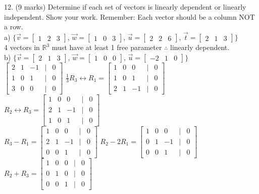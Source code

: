 \documentclass[a4paper]{article}
\begin{document}
12. (9 marks) Determine if each set of vectors is linearly dependent or linearly independent. Show your work. Remember: Each vector should be a column NOT a row.\\
a) $\{\vec{v} = \begin{bmatrix}
1&2&3
\end{bmatrix}$, $\vec{w} = \begin{bmatrix}
1&0&3
\end{bmatrix}$, $\vec{u} = \begin{bmatrix}
2&2&6
\end{bmatrix}$, $\vec{t} = \begin{bmatrix}
2&1&3
\end{bmatrix}\}$\\
4 vectors in $\mathbb{R}^3$ must have at least 1 free parameter $\therefore$ linearly dependent.\\
b) $\{\vec{v} = \begin{bmatrix}
2&1&3
\end{bmatrix}$, $\vec{w} = \begin{bmatrix}
1&0&0
\end{bmatrix}$, $\vec{u} = \begin{bmatrix}
-2&1&0
\end{bmatrix}\}$\\
$\begin{bmatrix}
2&1&-1&|&0\\
1&0&1&|&0\\
3&0&0&|&0
\end{bmatrix}$ $\frac{1}{3}R_3 \leftrightarrow R_1 = \begin{bmatrix}
1&0&0&|&0\\
1&0&1&|&0\\
2&1&-1&|&0
\end{bmatrix}$ $R_2 \leftrightarrow R_3 = \begin{bmatrix}
1&0&0&|&0\\
2&1&-1&|&0\\
1&0&1&|&0
\end{bmatrix}$\\
$R_3 - R_1 = \begin{bmatrix}
1&0&0&|&0\\
2&1&-1&|&0\\
0&0&1&|&0
\end{bmatrix}$ $R_2 - 2R_1 = \begin{bmatrix}
1&0&0&|&0\\
0&1&-1&|&0\\
0&0&1&|&0
\end{bmatrix}$ $R_2 + R_3 = \begin{bmatrix}
1&0&0&|&0\\
0&1&0&|&0\\
0&0&1&|&0
\end{bmatrix}$\\
\end{document}
